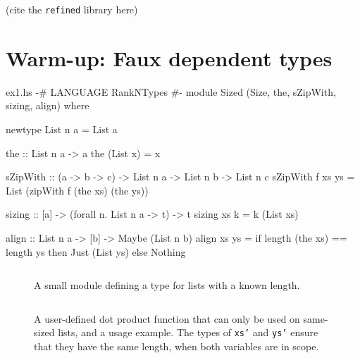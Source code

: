 \documentclass[format=sigplan, review=false, screen=true]{acmart}
\begin{document}
(cite the \texttt{refined} library here) \cite{refined}


\section{Warm-up: Faux dependent types}

\begin{filecontents*}{ex1.hs}  
{-# LANGUAGE RankNTypes #-}
module Sized (Size, the, sZipWith, sizing, align) where

newtype List n a = List a

the :: List n a -> a
the (List x) = x

sZipWith ::
  (a -> b -> c) -> List n a -> List n b -> List n c
sZipWith f xs ys = List (zipWith f (the xs) (the ys))
  
sizing :: [a] -> (forall n. List n a -> t) -> t
sizing xs k = k (List xs)

align :: List n a -> [b] -> Maybe (List n b)
align xs ys = if length (the xs) == length ys
              then Just (List ys)
              else Nothing
\end{filecontents*}


\begin{figure}
    \inputminted{haskell}{ex1.hs}
  \caption{A small module defining a type for lists with a known length. \label{sizing}}
\end{figure}
\begin{figure}
    \inputminted{haskell}{ex2.hs}
    \caption{A user-defined dot product function that can only be used on same-sized lists,
      and a usage example. The types of \texttt{xs'} and \texttt{ys'} ensure that they have
      the same length, when both variables are in scope.\label{dot-product}}
\end{figure}
\end{document}
